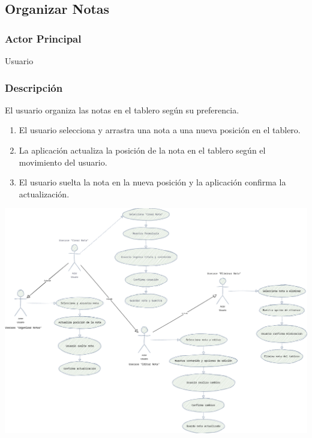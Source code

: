 \subsection{Organizar Notas}
\subsubsection{Actor Principal}
Usuario

\subsubsection{Descripción}
El usuario organiza las notas en el tablero según su preferencia.

\begin{enumerate}
  \item El usuario selecciona y arrastra una nota a una nueva posición en el tablero.
  \item La aplicación actualiza la posición de la nota en el tablero según el movimiento del usuario.
  \item El usuario suelta la nota en la nueva posición y la aplicación confirma la actualización.
\end{enumerate}

\begin{center}
    \includegraphics[scale = .20]{IMA/CasosUso.drawio.png}
\end{center}
